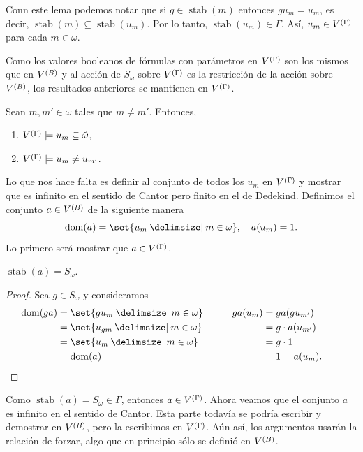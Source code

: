 \documentclass[letterpaper,DIV=15,12pt]{scrartcl}
\DeclareMathOperator{\dom}{dom}                            %
\DeclareMathOperator{\stab}{stab}                          %
\newcommand{\st}{}
\newcommand{\SetSymbol}[1][]{%
\nonscript\:#1\vert
\allowbreak
\nonscript\:
\mathopen{}}
\renewcommand\st{\SetSymbol[\delimsize]}
\begin{document}
Conn este lema podemos notar que si \(g\in\stab(m)\) entonces \(gu_m=u_m\), es
decir, \(\stab(m)\subseteq\stab(u_m)\). Por lo tanto, \(\stab(u_m)\in\Gamma\).
Así, \(u_m\in\mg\) para cada \(m\in\omega\).

Como los valores booleanos de fórmulas con parámetros en \(\mg\) son los mismos
que en \(\mb\) y al acción de \(S_{\omega}\) sobre \(\mg\) es la restricción de
la acción sobre \(\mb\), los resultados anteriores se mantienen en \(\mg\).

\begin{corollary}[label=cor:um]
    Sean \(m,m'\in\omega\) tales que \(m\ne m'\). Entonces,
    \begin{enumerate}
        \item \(\mg\models u_m\subseteq\check{\omega}\),
        \item \(\mg\models u_m\ne u_{m'}\).
    \end{enumerate}
\end{corollary}

Lo que nos hace falta es definir al conjunto de todos los \(u_m\) en \(\mg\) y
mostrar que es infinito en el sentido de Cantor pero finito en el de Dedekind.
Definimos el conjunto \(a\in\mb\) de la siguiente manera
\begin{equation*}
    \dom(a)=\set{u_m\st m\in\omega}, \quad a(u_m)=1.
\end{equation*}
Lo primero será mostrar que \(a\in\mg\).

\begin{lemma}
    \(\stab(a)=S_{\omega}\).
\end{lemma}
\begin{proof}
    Sea \(g\in S_{\omega}\) y consideramos
    \begin{alignat*}{2}
        \dom(ga)&=\set{gu_m\st m\in\omega} &\qquad ga(u_m)&=ga(gu_{m'})\\
        &=\set{u_{gm}\st m\in\omega} & &=g\cdot a(u_{m'})\\
        &=\set{u_{m}\st m\in\omega} & &=g\cdot 1\\
        &=\dom(a) & &=1=a(u_{m}). \tag*{\qedhere}
    \end{alignat*}
\end{proof}

Como \(\stab(a)=S_{\omega}\in\Gamma\), entonces \(a\in\mg\). Ahora veamos que el
conjunto \(a\) es infinito en el sentido de Cantor. Esta parte todavía se podría
escribir y demostrar en \(\mb\), pero la escribimos en \(\mg\). Aún así, los
argumentos usarán la relación de forzar, algo que en principio sólo se definió
en \(\mb\).
\end{document}
